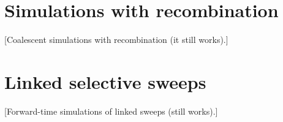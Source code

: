 \documentclass[11pt, letterpaper]{article}   	%
\newcommand{\E}[1]{\left< #1 \right>}
\begin{document}
%
%
%

\section*{Simulations with recombination}
[Coalescent simulations with recombination (it still works).]

\section*{Linked selective sweeps}
[Forward-time simulations of linked sweeps (still works).]
\end{document}
